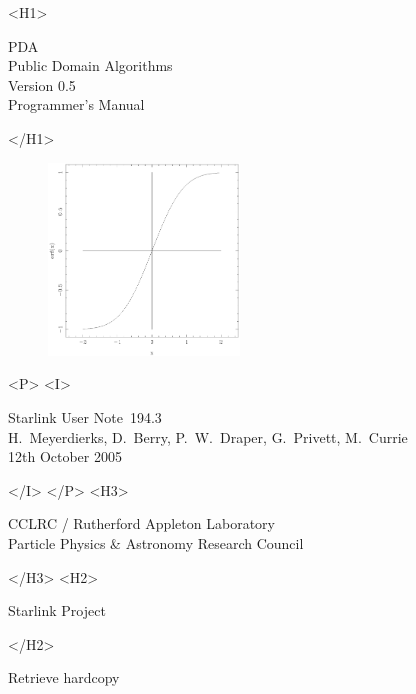 \documentclass[11pt,twoside]{article}
\newcommand{\stardoccategory}  {Starlink User Note}
\newcommand{\stardocsource}    {sun194.3}
\newcommand{\stardocnumber}    {194.3}
\newcommand{\stardocauthors}   {H.\ Meyerdierks, D.\ Berry, P.\ W.\ Draper, G.\ Privett, M.\ Currie }
\newcommand{\stardocdate}      {12th October 2005}
\newcommand{\stardoctitle}     {PDA \\ [\latex{1ex}]
                                Public Domain Algorithms}
\newcommand{\stardocversion}   {Version 0.5}
\newcommand{\stardocmanual}    {Programmer's Manual}
\newcommand{\htmladdnormallink}[2]{#1}
\newcommand{\htmladdimg}[1]{}
\newcommand{\xlabel}[1]{}
\newcommand{\latex}[1]{#1}
\begin{document}
\begin{htmlonly}
   \xlabel{}
   \begin{rawhtml} <H1> \end{rawhtml}
      \stardoctitle\\
      \stardocversion\\
      \stardocmanual
   \begin{rawhtml} </H1> \end{rawhtml}

   \begin{figure}[h]
      \includegraphics[width=2.0in]{sun194_1.eps}
   \end{figure}

   \begin{rawhtml} <P> <I> \end{rawhtml}
   \stardoccategory\ \stardocnumber \\
   \stardocauthors \\
   \stardocdate
   \begin{rawhtml} </I> </P> <H3> \end{rawhtml}
      \htmladdnormallink{CCLRC}{http://www.cclrc.ac.uk} /
      \htmladdnormallink{Rutherford Appleton Laboratory}
                        {http://www.cclrc.ac.uk/ral} \\
      \htmladdnormallink{Particle Physics \& Astronomy Research Council}
                        {http://www.pparc.ac.uk} \\
   \begin{rawhtml} </H3> <H2> \end{rawhtml}
      \htmladdnormallink{Starlink Project}{http://www.starlink.ac.uk/}
   \begin{rawhtml} </H2> \end{rawhtml}
   \htmladdnormallink{\htmladdimg{source.gif} Retrieve hardcopy}
      {http://www.starlink.ac.uk/cgi-bin/hcserver?\stardocsource}\\


\end{htmlonly}
\end{document}
